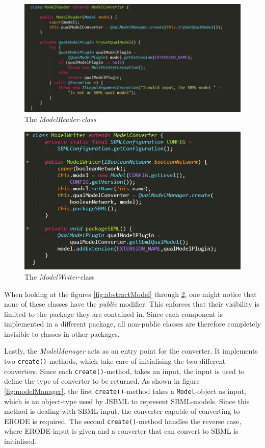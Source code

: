 \begin{figure}[H]
    \centering
    \includegraphics[scale=0.75]{Sections/Images/ModelReader.JPG}
    \caption{The \emph{ModelReader-class}}
    \label{fig:modelReader}
\end{figure}

\begin{figure}[H]
    \centering
    \includegraphics[scale=0.75]{Sections/Images/ModelWriter.JPG}
    \caption{The \emph{ModelWriter}-class}
    \label{fig:modelWriter}
\end{figure}

When looking at the figures \ref{fig:abstractModel} through \ref{fig:modelWriter}, one might notice that none of these classes have the \emph{public} modifier. This enforces that their visibility is limited to the package they are contained in. Since each component is implemented in a different package, all non-public classes are therefore completely invisible to classes in other packages.

Lastly, the \emph{ModelManager} acts as an entry point for the converter. It implements two \texttt{create()}-methods, which take care of initialising the two different converters. Since each \texttt{create()}-method, takes an input, the input is used to define the type of converter to be returned.
As shown in figure \ref{fig:modelManager}, the first \texttt{create()}-method takes a \texttt{Model}-object as input, which is an object-type used by JSBML to represent SBML-models. Since this method is dealing with SBML-input, the converter capable of converting to ERODE is required. The second \texttt{create()}-method handles the reverse case, where ERODE-input is given and a converter that can convert to SBML is initialised.

